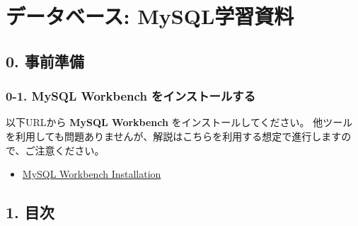 \section{データベース:
MySQL学習資料}\label{ux30c7ux30fcux30bfux30d9ux30fcux30b9-mysqlux5b66ux7fd2ux8cc7ux6599}

\subsection{0. 事前準備}\label{ux4e8bux524dux6e96ux5099}

\subsubsection{0-1. MySQL Workbench
をインストールする}\label{mysql-workbench-ux3092ux30a4ux30f3ux30b9ux30c8ux30fcux30ebux3059ux308b}

以下URLから \textbf{MySQL Workbench} をインストールしてください。
他ツールを利用しても問題ありませんが、解説はこちらを利用する想定で進行しますので、ご注意ください。

\begin{itemize}
\tightlist
\item
  \href{https://www.mysql.com/jp/products/workbench/}{MySQL Workbench
  Installation}
\end{itemize}

\subsection{1. 目次}\label{ux76eeux6b21}

